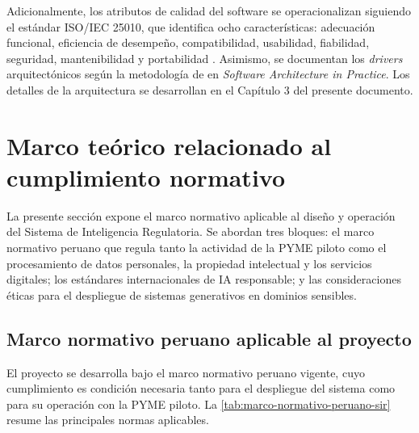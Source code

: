 \documentclass[12pt,a4paper,oneside]{report}
\begin{document}
Adicionalmente, los atributos de calidad del software se operacionalizan siguiendo el estándar ISO/IEC 25010, que identifica ocho características: adecuación funcional, eficiencia de desempeño, compatibilidad, usabilidad, fiabilidad, seguridad, mantenibilidad y portabilidad \parencite{iso25010}. Asimismo, se documentan los \textit{drivers} arquitectónicos según la metodología de \textcite{bass2021} en \textit{Software Architecture in Practice}. Los detalles de la arquitectura se desarrollan en el Capítulo 3 del presente documento.

\section{Marco teórico relacionado al cumplimiento normativo}\label{sec:marco-teorico-cumplimiento-normativo}

La presente sección expone el marco normativo aplicable al diseño y operación del Sistema de Inteligencia Regulatoria. Se abordan tres bloques: el marco normativo peruano que regula tanto la actividad de la PYME piloto como el procesamiento de datos personales, la propiedad intelectual y los servicios digitales; los estándares internacionales de IA responsable; y las consideraciones éticas para el despliegue de sistemas generativos en dominios sensibles.

\subsection{Marco normativo peruano aplicable al proyecto}\label{subsec:marco-normativo-peruano-proyecto}

El proyecto se desarrolla bajo el marco normativo peruano vigente, cuyo cumplimiento es condición necesaria tanto para el despliegue del sistema como para su operación con la PYME piloto. La \cref{tab:marco-normativo-peruano-sir} resume las principales normas aplicables.
\end{document}
